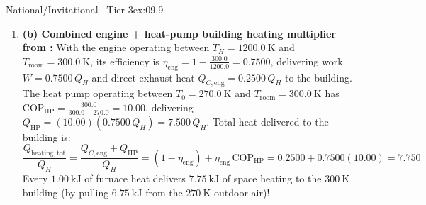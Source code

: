 \begin{workedexample}{National/Invitational \textbar\ Tier 3}{ex:09.9}
\begin{enumerate}
\[  \]
  \item \textbf{(b) Combined engine + heat-pump building heating multiplier from :}
  With the engine operating between $T_H = \SI{1200.0}{\kelvin}$ and $T_{\mathrm{room}} = \SI{300.0}{\kelvin}$, its efficiency is $\eta_{\mathrm{eng}} = 1 - \frac{300.0}{1200.0} = \mathbf{0.7500}$, delivering work $W = 0.7500\,Q_H$ and direct exhaust heat $Q_{C,\mathrm{eng}} = 0.2500\,Q_H$ to the building. The heat pump operating between $T_0 = \SI{270.0}{\kelvin}$ and $T_{\mathrm{room}} = \SI{300.0}{\kelvin}$ has $\mathrm{COP}_{\mathrm{HP}} = \frac{300.0}{300.0 - 270.0} = \mathbf{10.00}$, delivering $Q_{\mathrm{HP}} = (10.00)(0.7500\,Q_H) = 7.500\,Q_H$. Total heat delivered to the building is:
  \[
    \frac{Q_{\mathrm{heating,tot}}}{Q_H} = \frac{Q_{C,\mathrm{eng}} + Q_{\mathrm{HP}}}{Q_H} = (1 - \eta_{\mathrm{eng}}) + \eta_{\mathrm{eng}}\,\mathrm{COP}_{\mathrm{HP}} = 0.2500 + 0.7500(10.00) = \mathbf{7.750}
  \]
  Every $\SI{1.00}{\kilo\joule}$ of furnace heat delivers $\SI{7.75}{\kilo\joule}$ of space heating to the $\SI{300}{\kelvin}$ building (by pulling $\SI{6.75}{\kilo\joule}$ from the $\SI{270}{\kelvin}$ outdoor air)!
\end{enumerate}
\end{workedexample}

